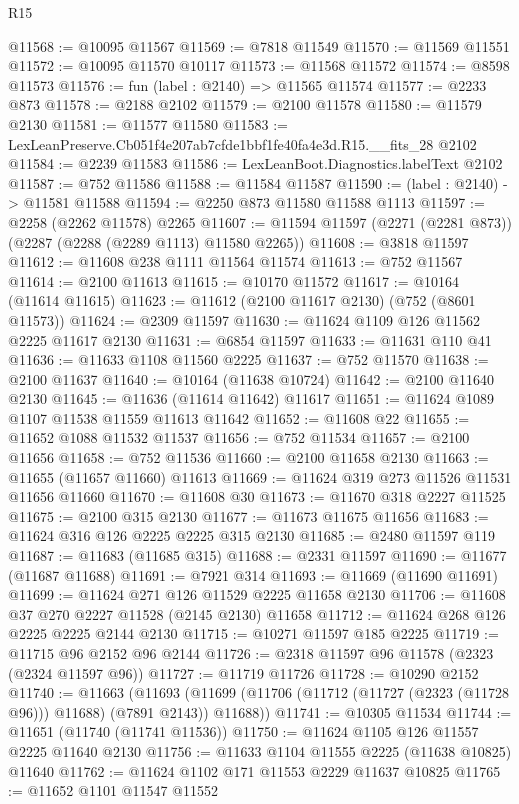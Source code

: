 \begin{lexlean}{R15}
\begin{coremodule}
@11568 := @10095 @11567
@11569 := @7818 @11549
@11570 := @11569 @11551
@11572 := @10095 @11570 @10117
@11573 := @11568 @11572
@11574 := @8598 @11573
@11576 := fun (label : @2140) => @11565 @11574
@11577 := @2233 @873
@11578 := @2188 @2102
@11579 := @2100 @11578
@11580 := @11579 @2130
@11581 := @11577 @11580
@11583 := LexLeanPreserve.Cb051f4e207ab7cfde1bbf1fe40fa4e3d.R15.__fits_28 @2102
@11584 := @2239 @11583
@11586 := LexLeanBoot.Diagnostics.labelText @2102
@11587 := @752 @11586
@11588 := @11584 @11587
@11590 := (label : @2140) -> @11581 @11588
@11594 := @2250 @873 @11580 @11588 @1113
@11597 := @2258 (@2262 @11578) @2265
@11607 := @11594 @11597 (@2271 (@2281 @873)) (@2287 (@2288 (@2289 @1113) @11580 @2265))
@11608 := @3818 @11597
@11612 := @11608 @238 @1111 @11564 @11574
@11613 := @752 @11567
@11614 := @2100 @11613
@11615 := @10170 @11572
@11617 := @10164 (@11614 @11615)
@11623 := @11612 (@2100 @11617 @2130) (@752 (@8601 @11573))
@11624 := @2309 @11597
@11630 := @11624 @1109 @126 @11562 @2225 @11617 @2130
@11631 := @6854 @11597
@11633 := @11631 @110 @41
@11636 := @11633 @1108 @11560 @2225
@11637 := @752 @11570
@11638 := @2100 @11637
@11640 := @10164 (@11638 @10724)
@11642 := @2100 @11640 @2130
@11645 := @11636 (@11614 @11642) @11617
@11651 := @11624 @1089 @1107 @11538 @11559 @11613 @11642
@11652 := @11608 @22
@11655 := @11652 @1088 @11532 @11537
@11656 := @752 @11534
@11657 := @2100 @11656
@11658 := @752 @11536
@11660 := @2100 @11658 @2130
@11663 := @11655 (@11657 @11660) @11613
@11669 := @11624 @319 @273 @11526 @11531 @11656 @11660
@11670 := @11608 @30
@11673 := @11670 @318 @2227 @11525
@11675 := @2100 @315 @2130
@11677 := @11673 @11675 @11656
@11683 := @11624 @316 @126 @2225 @2225 @315 @2130
@11685 := @2480 @11597 @119
@11687 := @11683 (@11685 @315)
@11688 := @2331 @11597
@11690 := @11677 (@11687 @11688)
@11691 := @7921 @314
@11693 := @11669 (@11690 @11691)
@11699 := @11624 @271 @126 @11529 @2225 @11658 @2130
@11706 := @11608 @37 @270 @2227 @11528 (@2145 @2130) @11658
@11712 := @11624 @268 @126 @2225 @2225 @2144 @2130
@11715 := @10271 @11597 @185 @2225
@11719 := @11715 @96 @2152 @96 @2144
@11726 := @2318 @11597 @96 @11578 (@2323 (@2324 @11597 @96))
@11727 := @11719 @11726
@11728 := @10290 @2152
@11740 := @11663
    (@11693 (@11699 (@11706 (@11712 (@11727 (@2323 (@11728 @96))) @11688) (@7891 @2143)) @11688))
@11741 := @10305 @11534
@11744 := @11651 (@11740 (@11741 @11536))
@11750 := @11624 @1105 @126 @11557 @2225 @11640 @2130
@11756 := @11633 @1104 @11555 @2225 (@11638 @10825) @11640
@11762 := @11624 @1102 @171 @11553 @2229 @11637 @10825
@11765 := @11652 @1101 @11547 @11552

\end{coremodule}
\end{lexlean}
